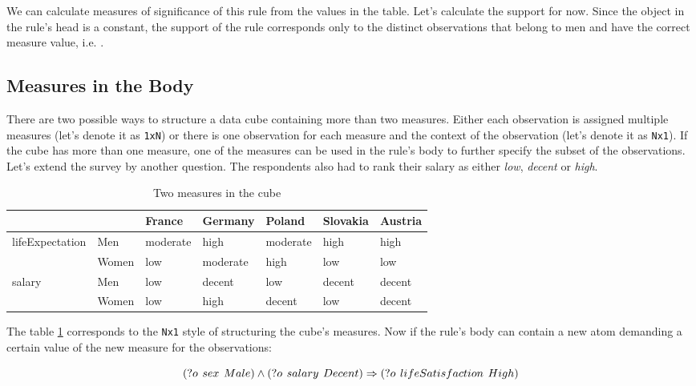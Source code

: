 We can calculate measures of significance of this rule from the values in the table. Let's calculate the support for now. Since the object in the rule's head is a constant, the support of the rule corresponds only to the distinct observations that belong to men and have the correct measure value, i.e. . 



\subsection{Measures in the Body}

There are two possible ways to structure a data cube containing more than two measures. Either each observation is assigned multiple measures (let's denote it as \verb|1xN|) or there is one observation for each measure and the context of the observation (let's denote it as \verb|Nx1|). If the cube has more than one measure, one of the measures can be used in the rule's body to further specify the subset of the observations. Let's extend the survey by another question. The respondents also had to rank their salary as either \textit{low}, \textit{decent} or \textit{high}.

\begin{table}[h]
\centering
\begin{tabular}{ll|lllll}
                                 &       & France   & Germany  & Poland   & Slovakia & Austria  \\ 
\hline
\multirow{2}{*}{lifeExpectation} & Men   & moderate & high     & moderate & high     & high     \\
                                     & Women & low      & moderate & high     & low      & low      \\ 
\hline
\multirow{2}{*}{salary}          & Men   & low      & decent   & low      & decent   & decent     \\
                                     & Women & low      & high     & decent   & low      & decent  
\end{tabular}
\caption{Two measures in the cube}\label{table2}
\end{table}

The table \ref{table2} corresponds to the \verb|Nx1| style of structuring the cube's measures. Now if the rule's body can contain a new atom demanding a certain value of the new measure for the observations:

\begin{equation}\label{rule2}
(?o\hspace{0.4em}sex\hspace{0.4em}Male) \land (?o\hspace{0.4em}salary\hspace{0.4em}Decent)  \Rightarrow (?o\hspace{0.4em}lifeSatisfaction\hspace{0.4em}High) 
\end{equation}

